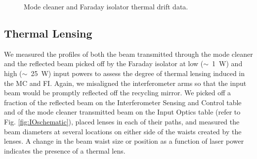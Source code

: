 \begin{figure}
\begin{centering}
\caption[Mode cleaner and Faraday isolator thermal drift data.]{Mode
  cleaner and Faraday isolator thermal drift data.}
\label{fig:drift}
\end{centering}
\end{figure}


\subsection{Thermal Lensing}
We measured the profiles of both the beam transmitted through the
mode cleaner and the reflected beam picked off by the Faraday isolator
at low ($\sim$~1~W) and high ($\sim$~25~W) input powers to assess the
degree of thermal lensing induced in the MC and FI. Again, we
misaligned the interferometer arms so that the input beam would be
promptly reflected off the recycling mirror. We picked off a fraction
of the reflected beam on the Interferometer Sensing and Control table
and of the mode cleaner transmitted beam on the Input Optics table
(refer to Fig. \ref{fig:IOschematic}), placed lenses in each of their
paths, and measured the beam diameters at several locations on either
side of the waists created by the lenses. A change in the beam waist
size or position as a function of laser power indicates the presence
of a thermal lens.


